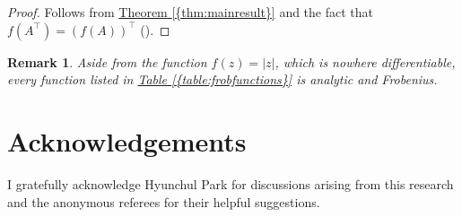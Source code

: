 \documentclass[10pt,twoside,leqno]{siamltex}
\newtheorem{rem}[theorem]{Remark}
\begin{document}
\begin{proof}
Follows from {\hyperref[{thm:mainresult}]{{\rm {Theorem} \ref*{{thm:mainresult}}}}} and the fact that $f(A^\top) = (f(A))^\top$ (\cite[Theorem 1.13(b)]{h2008}).
\end{proof}

\begin{rem}
{\rm Aside from the function $f(z) = |z|$, which is nowhere differentiable, every function listed in {\hyperref[{table:frobfunctions}]{{\rm {Table} \ref*{{table:frobfunctions}}}}} is analytic and Frobenius.}
\end{rem}

\section{Acknowledgements}

I gratefully acknowledge Hyunchul Park for discussions arising from this research and the anonymous referees for their helpful suggestions.



\end{document}
